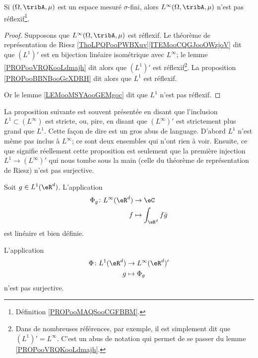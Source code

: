 \begin{lemma}     \label{LEMooUSXTooFvpsVd}
	Si \( (\Omega,\tribA,\mu)\) est un espace mesuré \( \sigma\)-fini, alors \( L^{\infty}(\Omega,\tribA,\mu)\) n'est pas réflexif\footnote{Définition \ref{PROPooMAQSooCGFBBM}.}.
\end{lemma}

\begin{proof}
	Supposons que \( L^{\infty}(\Omega,\tribA,\mu)\) est réflexif. Le théorème de représentation de Riesz \ref{ThoLPQPooPWBXuv}\ref{ITEMooCQGJooOWzjoV} dit que \( (L^1)'\) est en bijection linéaire isométrique avec \( L^{\infty}\); le lemme \ref{PROPooVRQKooLdmajh} dit alors que \( (L^1)'\) est réflexif\footnote{Dans de nombreuses références, par exemple\cite{BIBooFDGQooYferue}, il est simplement dit que \( (L^1)'=L^{\infty}\). C'est un abus de notation qui permet de se passer du lemme \ref{PROPooVRQKooLdmajh}.}. La proposition \ref{PROPooBBNBooGcXDRH} dit alors que \( L^1\) est réflexif.

	Or le lemme \ref{LEMooMSYAooGEMgoc} dit que \( L^1\) n'est pas réflexif.
\end{proof}



La proposition suivante est souvent présentée en disant que l'inclusion \( L^1\subset (L^{\infty})\) est stricte, ou, pire, en disant que \( (L^{\infty})'\) est strictement plus grand que \( L^1\). Cette façon de dire est un gros abus de language. D'abord \( L^1\) n'est même pas inclus à \( L^{\infty}\); ce sont deux ensembles qui n'ont rien à voir. Ensuite, ce que signifie réellement cette proposition est seulement que la première injection \( L^1\to (L^{\infty})'\) qui nous tombe sous la main (celle du théorème de représentation de Riesz) n'est pas surjective.
\begin{proposition}     \label{PROPooXXRQooNSBZOi}
	Soit \( g\in L^1(\eR^d)\). L'application
	\begin{equation}
		\begin{aligned}
			\Phi_g\colon L^{\infty}(\eR^d) & \to \eC                     \\
			f                              & \mapsto \int_{\eR^d}f\bar g
		\end{aligned}
	\end{equation}
	est linéaire et bien définie.

	L'application
	\begin{equation}
		\begin{aligned}
			\Phi\colon L^1(\eR^d) & \to L^{\infty}(\eR^d)' \\
			g                     & \mapsto \Phi_g
		\end{aligned}
	\end{equation}
	n'est pas surjective.
\end{proposition}

